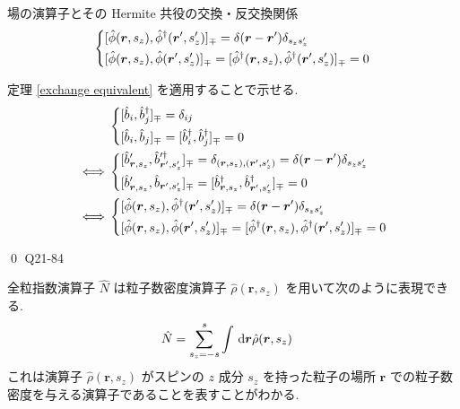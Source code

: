 \documentclass[uplatex,dvipdfmx,a4paper,11pt]{jlreq}
\makeatletter
\newcommand{\rr}{\bm{r}}
\numberwithin{equation}{section}
\theoremstyle{definition}
\renewenvironment{proof}[1][\proofname]{\par
  \normalfont
  \topsep6\p@\@plus6\p@ \trivlist
  \item[\hskip\labelsep{\bfseries #1}\@addpunct{\bfseries}]\ignorespaces\quad\par
}{
  \qed\endtrivlist\@endpefalse
}
\renewcommand\proofname{証明}
\makeatother
\begin{document}
\begin{theorem}[Q21-83]
  場の演算子とその Hermite 共役の交換・反交換関係
  \begin{align}
    \begin{dcases}
      [\hat{\phi}(\rr, s_z), \hat{\phi}^\dagger(\rr', s_z')]_\mp = \delta(\rr - \rr')\delta_{s_zs_z'} \\
      [\hat{\phi}(\rr, s_z), \hat{\phi}(\rr', s_z')]_\mp = [\hat{\phi}^\dagger(\rr, s_z), \hat{\phi}^\dagger(\rr', s_z')]_\mp = 0
    \end{dcases}
  \end{align}
\end{theorem}
\begin{proof}
  定理 \ref{exchange equivalent} を適用することで示せる.
  \begin{align}
         & \begin{dcases}
             [\hat{b}_i, \hat{b}_j^\dagger]_\mp = \delta_{ij} \\
             [\hat{b}_i, \hat{b}_j]_\mp = [\hat{b}_i^\dagger, \hat{b}_j^\dagger]_\mp = 0
           \end{dcases}                                                \\
    \iff & \begin{dcases}
             [\hat{b}_{\rr, s_z}', \hat{b}^{\prime\dagger}_{\rr', s_z'}]_\mp = \delta_{(\rr, s_z),(\rr', s_z')} = \delta(\rr - \rr')\delta_{s_zs_z'} \\
             [\hat{b}_{\rr, s_z}', \hat{b}_{\rr', s_z'}]_\mp = [\hat{b}^\dagger_{\rr, s_z}, \hat{b}^\dagger_{\rr', s_z'}]_\mp = 0
           \end{dcases} \\
    \iff & \begin{dcases}
             [\hat{\phi}(\rr, s_z), \hat{\phi}^\dagger(\rr', s_z')]_\mp = \delta(\rr - \rr')\delta_{s_zs_z'} \\
             [\hat{\phi}(\rr, s_z), \hat{\phi}(\rr', s_z')]_\mp = [\hat{\phi}^\dagger(\rr, s_z), \hat{\phi}^\dagger(\rr', s_z')]_\mp = 0
           \end{dcases}
  \end{align}
\end{proof}
Q21-84
\begin{theorem}[Q21-85(i)(ii)]
  全粒指数演算子 $\hat{N}$ は粒子数密度演算子 $\hat{\rho}(\rr, s_z)$ を用いて次のように表現できる.
  \begin{align}
    \hat{N} & = \sum_{s_z = -s}^{s}\int\dl{\rr}\hat{\rho}(\rr, s_z)
  \end{align}
  これは演算子 $\hat{\rho}(\rr, s_z)$ がスピンの $z$ 成分 $s_z$ を持った粒子の場所 $\rr$ での粒子数密度を与える演算子であることを表すことがわかる.
\end{theorem}
\end{document}
